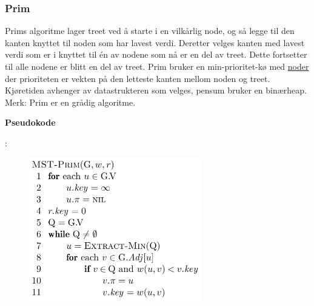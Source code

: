 \documentclass[12pt]{report}
\begin{document}




\newpage
\par

\subsubsection*{Prim}
\setlength{\parskip}{10.56pt}
Prims algoritme lager treet ved å starte i en vilkårlig node, og så legge til den kanten knyttet til noden som har lavest verdi. Deretter velges kanten med lavest verdi som er i knyttet til én av nodene som nå er en del av treet. Dette fortsetter til alle nodene er blitt en del av treet. Prim bruker en min-prioritet-kø med \uline{noder} der prioriteten er vekten på den letteste kanten mellom noden og treet. Kjøretiden avhenger av datastrukteren som velges, pensum bruker en binærheap. Merk: Prim er en grådig algoritme.\par

{\fontsize{13pt}{15.6pt}\selectfont \textbf{Pseudokode}\par}:\par




\begin{figure}[H]
	\begin{Center}
		\includegraphics[width=2.96in,height=2.47in]{./media/image122.png}
	\end{Center}
\end{figure}


\end{document}
